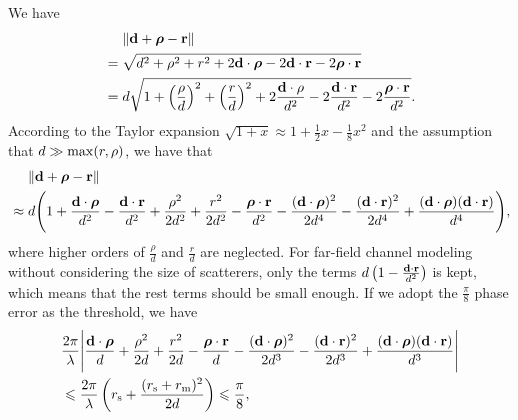 \documentclass[a4paper,12pt]{article}
\begin{document}
\begin{framed}
		\setcounter{equation}{40}
       \quad  We have 
        \begin{equation}
            \begin{aligned}
        &~~~~\|{\bf d}+\boldsymbol{\rho}-{\bf r}\| \\&= \sqrt{d^2+\rho^2+r^2+2{\bf d}\cdot\boldsymbol{\rho}-2{\bf d}\cdot{\bf r}-2\boldsymbol{\rho}\cdot{\bf r}}
        \\& = d \sqrt{1+\left( \frac{\rho}{d} \right)^2 + \left( \frac{r}{d} \right)^2+2\frac{{\bf d}\cdot{\bf \rho}}{d^2}-2\frac{{\bf d}\cdot{\bf r}}{d^2}-2\frac{\boldsymbol{\rho}\cdot{\bf r}}{d^2}}.
        \end{aligned}
        \end{equation}
        According to the Taylor expansion $\sqrt{1+x} \approx 1+\frac{1}{2}x-\frac{1}{8}x^2 $ and the assumption that $d \gg {\rm max}(r,\rho)$, we have that 
        \begin{equation}
            \begin{aligned}
        &~~~~\|{\bf d}+\boldsymbol{\rho}-{\bf r}\| \\&\approx d\Bigg( 1+ \frac{{\bf d}\cdot\boldsymbol{\rho}}{d^2}-\frac{{\bf d}\cdot{\bf r}}{d^2}+ \frac{\rho^2}{2d^2}  +\frac{r^2}{2d^2} -\frac{\boldsymbol{\rho}\cdot{\bf r}}{d^2} -\frac{({\bf d}\cdot\boldsymbol{\rho})^2}{2d^4} - \frac{({\bf d}\cdot{\bf r})^2}{2d^4} + \frac{({\bf d}\cdot\boldsymbol{\rho})({\bf d}\cdot{\bf r})}{d^4} \Bigg),
        \end{aligned}
        \end{equation}
        where higher orders of $\frac{\rho}{d}$ and $\frac{r}{d}$ are neglected. For far-field channel modeling without considering the size of scatterers, only the terms $d\left( 1- \frac{{\bf d}\cdot{\bf r}}{d^2}  \right)$ is kept, which means that the rest terms should be small enough. If we adopt the $\frac{\pi}{8}$ phase error as the threshold, we have 
        {\color{red}
        \begin{equation}
            \begin{aligned}
        &\frac{2\pi}{\lambda} \Bigg| \frac{{\bf d}\cdot\boldsymbol{\rho}}{d} +\frac{\rho^2}{2d} + \frac{r^2}{2d} - \frac{\boldsymbol{\rho}\cdot{\bf r}}{d}- \frac{({\bf d}\cdot\boldsymbol{\rho})^2}{2d^3} - \frac{({\bf d}\cdot{\bf r})^2}{2d^3} + \frac{({\bf d}\cdot\boldsymbol{\rho})({\bf d}\cdot{\bf r})}{d^3} \Bigg|
        \\& \leqslant \frac{2\pi}{\lambda} \left( r_{\rm s}+\frac{(r_{\rm s}+r_{\rm m})^2}{2d} \right) \leqslant \frac{\pi}{8},
            \end{aligned}

\end{equation}}
\end{framed}
\end{document}
